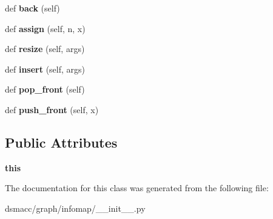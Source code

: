 \begin{DoxyCompactItemize}
def {\bfseries back} (self)
\item 
\mbox{\label{classdsmacc_1_1graph_1_1infomap_1_1UIntDeque_a9e6583ec66f28bbf6eea968f7b93c303}} 
def {\bfseries assign} (self, n, x)
\item 
\mbox{\label{classdsmacc_1_1graph_1_1infomap_1_1UIntDeque_ae34383b5790df22b9161615def2793b5}} 
def {\bfseries resize} (self, args)
\item 
\mbox{\label{classdsmacc_1_1graph_1_1infomap_1_1UIntDeque_a05f3a6711c3d5a4cf98295919aace42f}} 
def {\bfseries insert} (self, args)
\item 
\mbox{\label{classdsmacc_1_1graph_1_1infomap_1_1UIntDeque_a5a139e4bc2c82cb1b1a66520c9acaaef}} 
def {\bfseries pop\+\_\+front} (self)
\item 
\mbox{\label{classdsmacc_1_1graph_1_1infomap_1_1UIntDeque_a8c14f75ba2792f638ddf7c048440791a}} 
def {\bfseries push\+\_\+front} (self, x)
\end{DoxyCompactItemize}
\subsection*{Public Attributes}
\begin{DoxyCompactItemize}
\item 
\mbox{\label{classdsmacc_1_1graph_1_1infomap_1_1UIntDeque_aba0647ef2db23304ef8b41e9cf3912c9}} 
{\bfseries this}
\end{DoxyCompactItemize}


The documentation for this class was generated from the following file\+:\begin{DoxyCompactItemize}
\item 
dsmacc/graph/infomap/\+\_\+\+\_\+init\+\_\+\+\_\+.\+py\end{DoxyCompactItemize}
